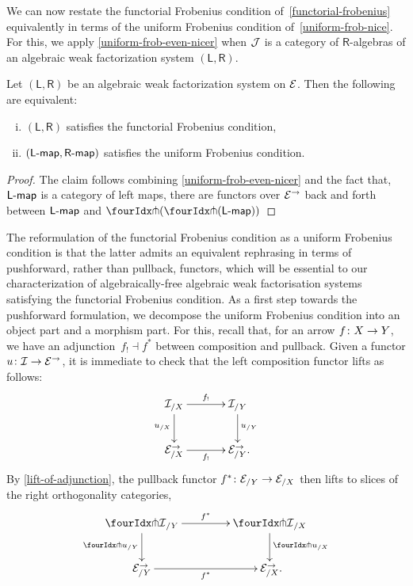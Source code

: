 \documentclass[reqno,10pt,a4paper,oneside,draft]{amsart}
\newcommand{\LL}{\mathsf{L}}
\newcommand{\RR}{\mathsf{R}}
\begin{document}
{{We can now restate the functorial Frobenius condition of~\cref{functorial-frobenius} equivalently in terms of
the uniform Frobenius condition of~\cref{uniform-frob-nice}. For this, we apply \cref{uniform-frob-even-nicer}
when $\cal{J}$ is a category of $\RR$-algebras of an algebraic weak factorization system $(\LL, \RR)$. 

\begin{proposition}
Let $(\mathsf{L}, \mathsf{R})$ be an algebraic weak factorization system on $\cal{E}$. Then the following are
equivalent:
\begin{enumerate}[(i)] 
\item $(\LL, \RR)$ satisfies the functorial Frobenius condition,
\item $(\pcoalg{\LL}, \palg{\RR})$ satisfies the uniform Frobenius condition.
\end{enumerate}
\end{proposition}

\begin{proof} The claim follows combining \cref{uniform-frob-even-nicer} and the fact that, $\pcoalg{\LL}$ is a category of left maps,
there are functors over $\cal{E}^\to$ back and forth between $\pcoalg{\LL}$ and $\liftl{(\liftr{(\pcoalg{\LL})})}$
\end{proof}


The reformulation of the functorial Frobenius condition as a uniform Frobenius condition is that the latter admits an 
equivalent rephrasing in terms of pushforward, rather than pullback, functors, which will be essential to our characterization of algebraically-free
algebraic weak factorisation systems satisfying the functorial Frobenius condition. As a first step towards the pushforward formulation,
we decompose the uniform Frobenius condition into an object part and a morphism part. For this, recall that, for an arrow $f \co X \to Y$, we have an adjunction~$f_{!} \dashv f^*$ between composition and pullback. 
Given a functor $u \co \cal{I} \to \catE^\to$, it is immediate to check that the left composition functor lifts as follows:
\[
\xymatrix@C+1em{
  \cal{I}_{/X}
  \ar[r]^-{f_!}
  \ar[d]_{u_{/X}}
&
  \cal{I}_{/Y}
  \ar[d]^{u_{/Y}}
\\
  \calE_{/X}^\to
  \ar[r]_-{f_!}
&
  \calE_{/Y}^\to
\rlap{.}}
\]
By \cref{lift-of-adjunction}, the pullback functor $f^* \co \catE_{/Y} \to \catE_{/X}$ then lifts to slices of the right orthogonality categories,
\[
\xymatrix@C=1.5cm{
  \liftr{\cal{I}}_{/Y}
  \ar[d]_{{\liftr{u}}_{/Y}}
  \ar[r]^{f^*}
&
  \liftr{\cal{I}}_{/X}
  \ar[d]^{{\liftr{u}}_{/X}}
\\
  {\catE}_{/Y}^\to
  \ar[r]_{f^*}
&
  \catE_{/X}^\to
\rlap{.}}
\]






}}
\end{document}
